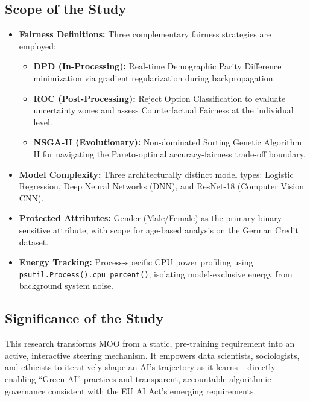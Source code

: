 \documentclass[12pt,a4paper]{article}
\begin{document}
\subsection{Scope of the Study}

\begin{itemize}
    \item \textbf{Fairness Definitions:} Three complementary fairness strategies are employed:
        \begin{itemize}
            \item \textbf{DPD (In-Processing):} Real-time Demographic Parity Difference minimization via gradient regularization during backpropagation.
            \item \textbf{ROC (Post-Processing):} Reject Option Classification to evaluate uncertainty zones and assess Counterfactual Fairness at the individual level.
            \item \textbf{NSGA-II (Evolutionary):} Non-dominated Sorting Genetic Algorithm II for navigating the Pareto-optimal accuracy-fairness trade-off boundary.
        \end{itemize}
    \item \textbf{Model Complexity:} Three architecturally distinct model types: Logistic Regression, Deep Neural Networks (DNN), and ResNet-18 (Computer Vision CNN).
    \item \textbf{Protected Attributes:} Gender (Male/Female) as the primary binary sensitive attribute, with scope for age-based analysis on the German Credit dataset.
    \item \textbf{Energy Tracking:} Process-specific CPU power profiling using \texttt{psutil.Process().cpu\_percent()}, isolating model-exclusive energy from background system noise.
\end{itemize}

\subsection{Significance of the Study}

This research transforms MOO from a static, pre-training requirement into an active, interactive steering mechanism. It empowers data scientists, sociologists, and ethicists to iteratively shape an AI's trajectory as it learns -- directly enabling ``Green AI'' practices and transparent, accountable algorithmic governance consistent with the EU AI Act's emerging requirements.

\end{document}
